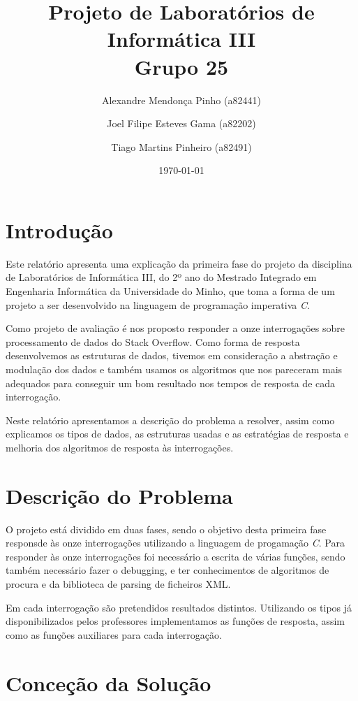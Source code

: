 \documentclass[10pt]{report}
\title{Projeto de Laboratórios de Informática III\\Grupo 25	}
\author{Alexandre Mendonça Pinho (a82441) \and Joel Filipe Esteves Gama (a82202) \and Tiago Martins Pinheiro (a82491)}
\date{\today}
\newcommand\tab[1][0.5cm]{\hspace*{#1}}
\begin{document}
\maketitle

\tableofcontents
\chapter{Introdução}
\label{sec:intro}

\tab Este relatório apresenta uma explicação da primeira fase do projeto da disciplina de Laboratórios de Informática III, do 2º ano do Mestrado Integrado em Engenharia Informática da Universidade do Minho, que toma a forma de um projeto a ser desenvolvido na linguagem de programação imperativa \textit{C}.

Como projeto de avaliação é nos proposto responder a onze interrogações sobre processamento de dados do Stack Overflow. Como forma de resposta desenvolvemos as estruturas de dados, tivemos em consideração a abstração e modulação dos dados e também usamos os algoritmos que nos pareceram mais adequados para conseguir um bom resultado nos tempos de resposta de cada interrogação.

Neste relatório apresentamos a descrição do problema a resolver, assim como explicamos os tipos de dados, as estruturas usadas e as estratégias de resposta e melhoria dos algoritmos de resposta às interrogações.
\chapter{Descrição do Problema}
\label{sec:problema}

\tab O projeto está dividido em duas fases, sendo o objetivo desta primeira fase responsde às onze interrogações utilizando a linguagem de progamação \textit{C}. Para responder às onze interrogações foi necessário a escrita de várias funções, sendo também necessário fazer o debugging, e ter conhecimentos de algoritmos de procura e da biblioteca de parsing de ficheiros XML.

Em cada interrogação são pretendidos resultados distintos. Utilizando os tipos já disponibilizados pelos professores implementamos as funções de resposta, assim como as funções auxiliares para cada interrogação.

\chapter{Conceção da Solução}
\end{document}
